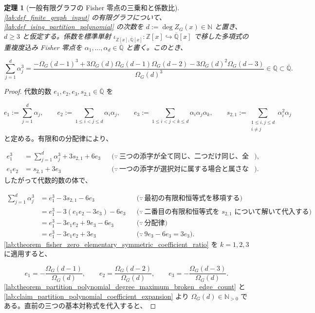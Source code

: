 \documentclass[11pt,a4paper]{article}
\newtheorem{theorem}[definition]{定理}
\theoremstyle{remark}
\begin{document}
\begin{theorem}[一般有限グラフの Fisher 零点の三乗和と係数比]\label{lab:theorem_fisher_zero_cube_sum_coefficient_ratio}
\cref{lab:def_finite_graph_input}
 の有限グラフについて、
\cref{lab:def_ising_partition_polynomial}
 の次数を
$d:=\deg Z_G(x)\in\mathbb N$
 と置き、
$d\ge3$
 と仮定する。係数を標準単射
$\iota_{\mathbb Z[x],\overline{\mathbb Q}[x]}:\mathbb Z[x]\hookrightarrow\overline{\mathbb Q}[x]$
 で移した多項式の重複度込み Fisher 零点を
$\alpha_1,\ldots,\alpha_d\in\overline{\mathbb Q}$
 と書く。このとき、

\[\sum_{j=1}^{d}\alpha_j^3
=
\frac{
  -\Omega_G(d-1)^3
  +3\Omega_G(d)\Omega_G(d-1)\Omega_G(d-2)
  -3\Omega_G(d)^2\Omega_G(d-3)
}{
  \Omega_G(d)^3
}
\in\mathbb Q
\subset\overline{\mathbb Q}.\]
\end{theorem}
\begin{proof}
代数的数
$e_1,e_2,e_3,s_{2,1}\in\overline{\mathbb Q}$
 を

\[e_1:=\sum_{j=1}^{d}\alpha_j,
\qquad
e_2:=\sum_{1\le i<j\le d}\alpha_i\alpha_j,
\qquad
e_3:=\sum_{1\le i<j<k\le d}\alpha_i\alpha_j\alpha_k,
\qquad
s_{2,1}:=\sum_{\substack{1\le i,j\le d\\i\ne j}}\alpha_i^2\alpha_j\]
と定める。有限和の分配律により、

\[\begin{aligned}
e_1^3
&=
\sum_{j=1}^{d}\alpha_j^3+3s_{2,1}+6e_3
&&\bigl(\because\ \text{三つの添字が全て同じ、二つだけ同じ、全て異なる場合へ分ける}\bigr),\\
e_1e_2
&=
s_{2,1}+3e_3
&&\bigl(\because\ \text{一つの添字が選択対に属する場合と属さない場合へ分ける}\bigr).
\end{aligned}\]
したがって代数的数の体で、

\[\begin{aligned}
\sum_{j=1}^{d}\alpha_j^3
&=
e_1^3-3s_{2,1}-6e_3
&&\bigl(\because\ \text{最初の有限和恒等式を移項する}\bigr)\\
&=
e_1^3-3(e_1e_2-3e_3)-6e_3
&&\bigl(\because\ \text{二番目の有限和恒等式を }s_{2,1}\text{ について解いて代入する}\bigr)\\
&=
e_1^3-3e_1e_2+9e_3-6e_3
&&\bigl(\because\ \text{分配律}\bigr)\\
&=
e_1^3-3e_1e_2+3e_3
&&\bigl(\because\ 9e_3-6e_3=3e_3\bigr).
\end{aligned}\]
\cref{lab:theorem_fisher_zero_elementary_symmetric_coefficient_ratio}
 を
$k=1,2,3$
 に適用すると、

\[e_1=-\frac{\Omega_G(d-1)}{\Omega_G(d)},
\qquad
e_2=\frac{\Omega_G(d-2)}{\Omega_G(d)},
\qquad
e_3=-\frac{\Omega_G(d-3)}{\Omega_G(d)}.\]
\cref{lab:theorem_partition_polynomial_degree_maximum_broken_edge_count}
 と
\cref{lab:claim_partition_polynomial_coefficient_expansion}
 より
$\Omega_G(d)\in\mathbb N_{>0}$
 である。直前の三つの基本対称式を代入すると、


\end{proof}
\end{document}
